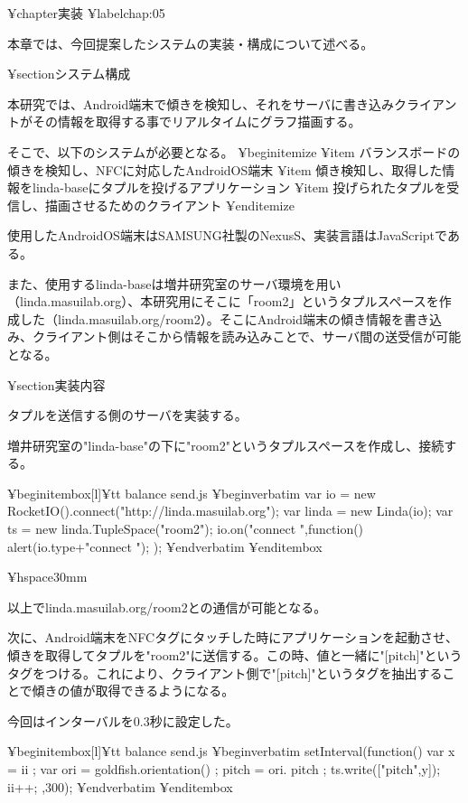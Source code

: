 ¥chapter{実装}
¥label{chap:05}

本章では、今回提案したシステムの実装・構成について述べる。

¥section{システム構成}

本研究では、Android端末で傾きを検知し、それをサーバに書き込みクライアントがその情報を取得する事でリアルタイムにグラフ描画する。

そこで、以下のシステムが必要となる。
¥begin{itemize}
   ¥item バランスボードの傾きを検知し、NFCに対応したAndroidOS端末
   ¥item 傾き検知し、取得した情報をlinda-baseにタプルを投げるアプリケーション
   ¥item 投げられたタプルを受信し、描画させるためのクライアント
¥end{itemize}

使用したAndroidOS端末はSAMSUNG社製のNexusS、実装言語はJavaScriptである。

また、使用するlinda-baseは増井研究室のサーバ環境を用い（linda.masuilab.org）、本研究用にそこに「room2」というタプルスペースを作成した（linda.masuilab.org/room2）。そこにAndroid端末の傾き情報を書き込み、クライアント側はそこから情報を読み込みことで、サーバ間の送受信が可能となる。


¥section{実装内容}

タプルを送信する側のサーバを実装する。

増井研究室の"linda-base"の下に"room2"というタプルスペースを作成し、接続する。


¥begin{itembox}[l]{{¥tt balance send.js}}
¥begin{verbatim}
var io = new RocketIO().connect("http://linda.masuilab.org");
var linda = new Linda(io);
var ts = new linda.TupleSpace("room2");
io.on("connect ",function(){
  alert(io.type+"connect ");
});  
¥end{verbatim}
¥end{itembox}



¥hspace{30mm} 

以上でlinda.masuilab.org/room2との通信が可能となる。


次に、Android端末をNFCタグにタッチした時にアプリケーションを起動させ、傾きを取得してタプルを"room2"に送信する。この時、値と一緒に"[pitch]"というタグをつける。これにより、クライアント側で"[pitch]"というタグを抽出することで傾きの値が取得できるようになる。

今回はインターバルを0.3秒に設定した。


¥begin{itembox}[l]{{¥tt balance send.js}}
¥begin{verbatim}
setInterval(function() {
        var x = ii ;
        var ori = goldfish.orientation() ;
        pitch = ori. pitch ;
        ts.write(["pitch",y]); 
        ii++;
},300); 
¥end{verbatim}
¥end{itembox}

